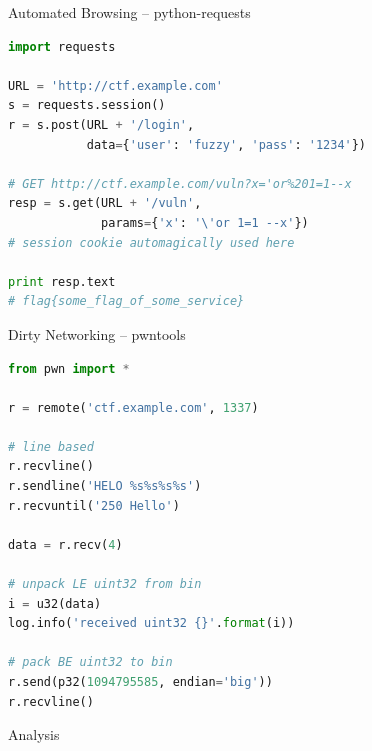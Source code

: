 

\begin{frame}[fragile]
  {Automated Browsing -- python-requests}

  \begin{lstlisting}[language=python]
import requests

URL = 'http://ctf.example.com'
s = requests.session()
r = s.post(URL + '/login',
           data={'user': 'fuzzy', 'pass': '1234'})

# GET http://ctf.example.com/vuln?x='or%201=1--x
resp = s.get(URL + '/vuln',
             params={'x': '\'or 1=1 --x'})
# session cookie automagically used here

print resp.text
# flag{some_flag_of_some_service}
  \end{lstlisting}
\end{frame}


\begin{frame}[fragile]
  {Dirty Networking -- pwntools}

  \begin{lstlisting}[language=python]
from pwn import *

r = remote('ctf.example.com', 1337)

# line based
r.recvline()
r.sendline('HELO %s%s%s%s')
r.recvuntil('250 Hello')

data = r.recv(4)

# unpack LE uint32 from bin
i = u32(data)
log.info('received uint32 {}'.format(i))

# pack BE uint32 to bin
r.send(p32(1094795585, endian='big'))
r.recvline()
  \end{lstlisting}
\end{frame}



{
\begin{frame}[plain]

  {\Huge Analysis}

  \vspace{16em}

\end{frame}
}


